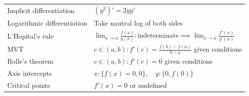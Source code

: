 \documentclass{article}
\begin{document}
\begin{tabular}{|l|l|}
    Implicit differentiation            & $(y^2)' = 2yy'$                                                                                                                                                                                                                                                                                      \\
    Logarithmic differentiation         & Take nautral log of both sides                                                                                                                                                                                                                                                                       \\
    L'Hopital's rule                    & $\lim_{x\to a}\frac{f(x)}{g(x)}:\text{indeterminate}\implies\lim_{x\to a}\frac{f'(x)}{g'(x)}$                                                                                                                                                                                                        \\
    MVT                                 & $ c\in(a,b):f'(c)=\frac{f(b)-f(a)}{b-a}$ given conditions                                                                                                                                                                                                                                            \\
    Rolle's theorem                     & $c\in(a,b):f'(c)=0$ given conditions                                                                                                                                                                                                                                                                 \\
    Axis intercepts                     & $x:\{f(x)=0,0\},\quad y:\{0,f(0)\}$                                                                                                                                                                                                                                                                  \\
    Critical points                     & $f'(x)=0$ or undefined                                                                                                                                                                                                                                                                               \\

\end{tabular}
\end{document}
